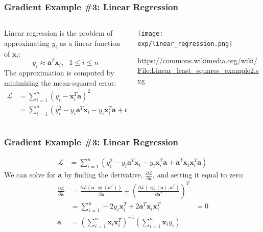 \documentclass{beamer}
\DeclareMathOperator*{\sg}{sg}
\begin{document}
\begin{frame}
  \frametitle{Gradient Example \#3: Linear Regression}
  \begin{columns}
    \begin{column}{0.5\textwidth}
      Linear regression is the problem of approximating $y_i$ as a linear function of $\mathbf{x}_i$:
      \begin{displaymath}
        y_i\approx \mathbf{a}^T\mathbf{x}_i,~~~1\le i\le n
      \end{displaymath}
      The approximation is computed by minimizing the mean-squared error:
      \begin{align*}
        {\mathcal{L}}&=\sum_{i=1}^n \left(y_i-\mathbf{x}_i^T\mathbf{a}\right)^2\\
        &=\sum_{i=1}^n \left(y_i^2-y_i\mathbf{a}^T\mathbf{x}_i-y_i\mathbf{x}_i^T\mathbf{a}+
        \mathbf{a}^T\mathbf{x}_i\mathbf{x}_i^T\mathbf{a}\right)
      \end{align*}
    \end{column}
    \begin{column}{0.5\textwidth}
      \centerline{\texttt{[image: exp/linear\_regression.png]}}
      \url{https://commons.wikimedia.org/wiki/File:Linear_least_squares_example2.svg}
    \end{column}
  \end{columns}
\end{frame}

\begin{frame}
  \frametitle{Gradient Example \#3: Linear Regression}

  \begin{align*}
    {\mathcal{L}}
    &=\sum_{i=1}^n \left(y_i^2-y_i\mathbf{a}^T\mathbf{x}_i-y_i\mathbf{x}_i^T\mathbf{a}+
    \mathbf{a}^T\mathbf{x}_i\mathbf{x}_i^T\mathbf{a}\right)
  \end{align*}
  We can solve for $\mathbf{a}$ by finding the derivative,
  $\frac{\partial\mathcal{L}}{\partial\mathbf{a}}$, and setting it
  equal to zero:
  \begin{align*}
    \frac{\partial\mathcal{L}}{\partial\mathbf{a}}
    &=
    \frac{\partial\mathcal{L}(\mathbf{a},\sg(\mathbf{a}^T))}{\partial\mathbf{a}}+
    \left(\frac{\partial\mathcal{L}(\sg(\mathbf{a}),\mathbf{a}^T)}{\partial\mathbf{a}^T}\right)^T\\
    &=\sum_{i=1}^n -2y_i\mathbf{x}_i^T+ 2\mathbf{a}^T\mathbf{x}_i\mathbf{x}_i^T
    &= 0\\
    \mathbf{a}
    &=\left(\sum_{i=1}^n\mathbf{x}_i\mathbf{x}_i^T\right)^{-1}\left(\sum_{i=1}^n\mathbf{x}_iy_i\right)
  \end{align*}
\end{frame}
\end{document}
